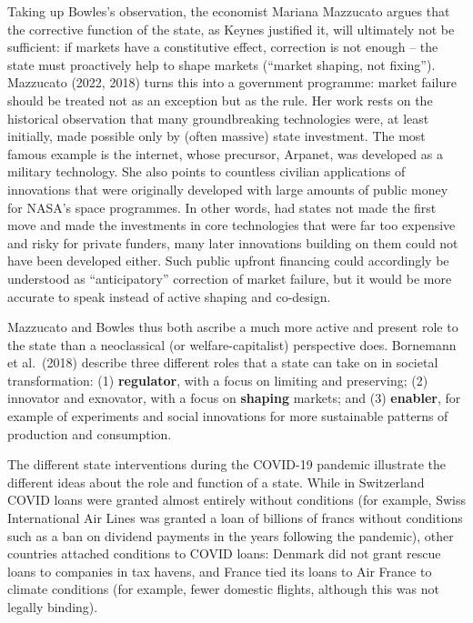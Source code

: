 \documentclass[
  british,
  a4paper,
  DIV=11,
  numbers=noendperiod,
  oneside,
  openany]{scrreprt}
\begin{document}
Taking up Bowles's observation, the economist Mariana Mazzucato argues
that the corrective function of the state, as Keynes justified it, will
ultimately not be sufficient: if markets have a constitutive effect,
correction is not enough -- the state must proactively help to shape
markets (``market shaping, not fixing''). Mazzucato (2022, 2018) turns
this into a government programme: market failure should be treated not
as an exception but as the rule. Her work rests on the historical
observation that many groundbreaking technologies were, at least
initially, made possible only by (often massive) state investment. The
most famous example is the internet, whose precursor, Arpanet, was
developed as a military technology. She also points to countless
civilian applications of innovations that were originally developed with
large amounts of public money for NASA's space programmes. In other
words, had states not made the first move and made the investments in
core technologies that were far too expensive and risky for private
funders, many later innovations building on them could not have been
developed either. Such public upfront financing could accordingly be
understood as ``anticipatory'' correction of market failure, but it
would be more accurate to speak instead of active shaping and co-design.

Mazzucato and Bowles thus both ascribe a much more active and present
role to the state than a neoclassical (or welfare-capitalist)
perspective does. Bornemann et al.~(2018) describe three different roles
that a state can take on in societal transformation: (1)
\textbf{regulator}, with a focus on limiting and preserving; (2)
innovator and exnovator, with a focus on \textbf{shaping} markets; and
(3) \textbf{enabler}, for example of experiments and social innovations
for more sustainable patterns of production and consumption.

The different state interventions during the COVID-19 pandemic
illustrate the different ideas about the role and function of a state.
While in Switzerland COVID loans were granted almost entirely without
conditions (for example, Swiss International Air Lines was granted a
loan of billions of francs without conditions such as a ban on dividend
payments in the years following the pandemic), other countries attached
conditions to COVID loans: Denmark did not grant rescue loans to
companies in tax havens, and France tied its loans to Air France to
climate conditions (for example, fewer domestic flights, although this
was not legally binding).
\end{document}
